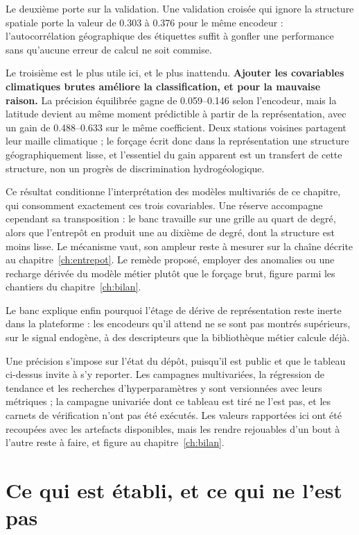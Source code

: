 Le deuxième porte sur la validation. Une validation croisée qui ignore la structure spatiale
porte la valeur de \num{0,303} à \num{0,376} pour le même encodeur : l'autocorrélation
géographique des étiquettes suffit à gonfler une performance sans qu'aucune erreur de calcul ne
soit commise.

Le troisième est le plus utile ici, et le plus inattendu. \textbf{Ajouter les covariables
climatiques brutes améliore la classification, et pour la mauvaise raison.} La précision
équilibrée gagne de \numrange{0,059}{0,146} selon l'encodeur, mais la latitude devient au même
moment prédictible à partir de la représentation, avec un gain de \numrange{0,488}{0,633} sur le
même coefficient. Deux stations voisines partagent leur maille climatique ; le forçage écrit donc
dans la représentation une structure géographiquement lisse, et l'essentiel du gain apparent est
un transfert de cette structure, non un progrès de discrimination hydrogéologique.

Ce résultat conditionne l'interprétation des modèles multivariés de ce chapitre, qui consomment
exactement ces trois covariables. Une réserve accompagne cependant sa transposition : le banc
travaille sur une grille au quart de degré, alors que l'entrepôt en produit une au dixième de
degré, dont la structure est moins lisse. Le mécanisme vaut, son ampleur reste à mesurer sur la
chaîne décrite au chapitre~\ref{ch:entrepot}. Le remède proposé, employer des anomalies ou une
recharge dérivée du modèle métier plutôt que le forçage brut, figure parmi les chantiers du
chapitre~\ref{ch:bilan}.

Le banc explique enfin pourquoi l'étage de dérive de représentation reste inerte dans la
plateforme : les encodeurs qu'il attend ne se sont pas montrés supérieurs, sur le signal
endogène, à des descripteurs que la bibliothèque métier calcule déjà.

Une précision s'impose sur l'état du dépôt, puisqu'il est public et que le tableau ci-dessus
invite à s'y reporter. Les campagnes multivariées, la régression de tendance et les recherches
d'hyperparamètres y sont versionnées avec leurs métriques ; la campagne univariée dont ce
tableau est tiré ne l'est pas, et les carnets de vérification n'ont pas été exécutés. Les
valeurs rapportées ici ont été recoupées avec les artefacts disponibles, mais les rendre
rejouables d'un bout à l'autre reste à faire, et figure au chapitre~\ref{ch:bilan}.

\section{Ce qui est établi, et ce qui ne l'est pas}


